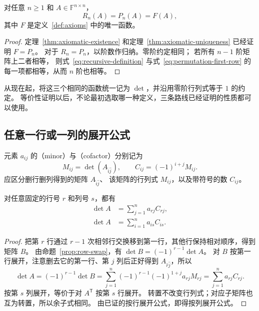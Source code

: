 \documentclass[UTF8,12pt,a4paper,fontset=fandol]{ctexart}
\begin{document}
\begin{corollary}[三种代数定义一致]
\label{cor:equivalent-definitions}
对任意 $n\geq1$ 和 $A\in\mathbb F^{n\times n}$，
\[
  R_n(A)=P_n(A)=F(A),
\]
其中 $F$ 是定义~\ref{def:axioms} 中的唯一函数。
\end{corollary}

\begin{proof}
定理~\ref{thm:axiomatic-existence} 和定理~\ref{thm:axiomatic-uniqueness}
已经证明 $F=P_n$。
对于 $R_n=P_n$，以阶数作归纳。零阶约定相同；
若所有 $n-1$ 阶矩阵上二者相等，
则式~\eqref{eq:recursive-definition} 与式~\eqref{eq:permutation-first-row}
的每一项都相等，从而 $n$ 阶也相等。
\end{proof}

从现在起，将这三个相同的函数统一记为 $\det$，并沿用零阶行列式等于 $1$ 的约定。
等价性证明以后，不论最初选取哪一种定义，三条路线已经证明的性质都可以使用。

\subsection{任意一行或一列的展开公式}

元素 $a_{ij}$ 的（minor）与（cofactor）分别记为
\[
  M_{ij}=\det(A_{\widehat i\widehat j}),\qquad
  C_{ij}=(-1)^{i+j}M_{ij}.
\]
应区分删行删列得到的矩阵 $A_{\widehat i\widehat j}$、
该矩阵的行列式 $M_{ij}$，以及带符号的数 $C_{ij}$。

\begin{theorem}[按任意行或列展开]
\label{thm:cofactor-expansion}
对任意固定的行号 $r$ 和列号 $s$，都有
\begin{align}
  \det A&=\sum_{j=1}^{n}a_{rj}C_{rj},
  \label{eq:arbitrary-row-expansion}\\
  \det A&=\sum_{i=1}^{n}a_{is}C_{is}.
  \label{eq:arbitrary-column-expansion}
\end{align}
\end{theorem}

\begin{proof}
把第 $r$ 行通过 $r-1$ 次相邻行交换移到第一行，其他行保持相对顺序，得到矩阵 $B$。
由命题~\ref{prop:row-swap}，有 $\det B=(-1)^{r-1}\det A$。
对 $B$ 按第一行展开，注意删去它的第一行、第 $j$ 列后正好得到
$A_{\widehat r\widehat j}$，所以
\[
  \det A
  =(-1)^{r-1}\det B
  =\sum_{j=1}^{n}(-1)^{r-1}(-1)^{1+j}a_{rj}M_{rj}
  =\sum_{j=1}^{n}a_{rj}C_{rj}.
\]
按第 $s$ 列展开，等价于对 $A^{\mathsf T}$ 按第 $s$ 行展开。
转置不改变行列式；对应子矩阵也互为转置，所以余子式相同。
由已证的按行展开公式，即得按列展开公式。
\end{proof}
\end{document}
